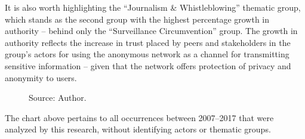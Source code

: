 It is also worth highlighting the ``Journalism \& Whistleblowing'' thematic group, which stands as the second group with the highest percentage growth in authority -- behind only the ``Surveillance Circumvention'' group. The growth in authority reflects the increase in trust placed by peers and stakeholders in the group's actors for using the anonymous network as a channel for transmitting sensitive information -- given that the network offers protection of privacy and anonymity to users.

\begin{figure}[H]
\centering
{}
\caption*{Source: Author.}
\end{figure}

The chart above pertains to all occurrences between 2007--2017 that were analyzed by this research, without identifying actors or thematic groups.

